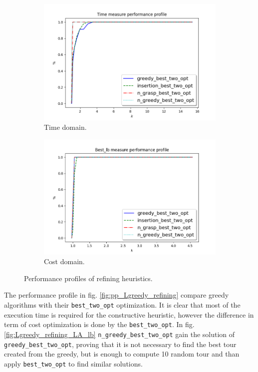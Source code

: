 \begin{figure}[!h]
	\centering
	\begin{subfigure}{.7\textwidth}
		\centering
		\includegraphics[width=\columnwidth]{../res/Lconstructives_refining_LA_time.png}
		\caption{Time domain.}
		\label{fig:Lconstructives_refining_time}
	\end{subfigure}
	\begin{subfigure}{.7\textwidth}
		\centering
		\includegraphics[width=\columnwidth]{../res/Lconstructives_refining_LA_lb.png}
		\caption{Cost domain.}
		\label{fig:Lconstructives_refining_lb}
	\end{subfigure}
\caption{Performance profiles of refining heuristics.}
\label{fig:pp_Lconstructives_refining}
\end{figure}

The performance profile in fig. \ref{fig:pp_Lgreedy_refining} compare greedy algorithms with their \texttt{best\_two\_opt} optimization. It is clear that most of the execution time is required for the constructive heuristic, however the difference in term of cost optimization is done by the \texttt{best\_two\_opt}. In fig. \ref{fig:Lgreedy_refining_LA_lb} \texttt{n\_greedy\_best\_two\_opt} gain the solution of \texttt{greedy\_best\_two\_opt}, proving that it is not necessary to find the best tour created from the greedy, but is enough to compute 10 random tour and than apply \texttt{best\_two\_opt} to find similar solutions.

